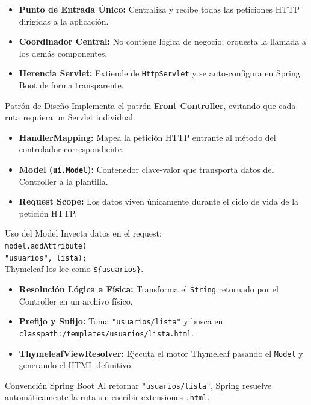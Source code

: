 \documentclass[aspectratio=169]{beamer}
\begin{document}
  {
    \begin{itemize}
      \item \textbf{Punto de Entrada \'Unico:} Centraliza y recibe todas las peticiones HTTP dirigidas a la aplicaci\'on.
      \item \textbf{Coordinador Central:} No contiene l\'ogica de negocio; orquesta la llamada a los dem\'as componentes.
      \item \textbf{Herencia Servlet:} Extiende de \texttt{HttpServlet} y se auto-configura en Spring Boot de forma transparente.
    \end{itemize}
  }
  {Patr\'on de Dise\~no}
  {Implementa el patr\'on \textbf{Front Controller}, evitando que cada ruta requiera un Servlet individual.}

  {
    \begin{itemize}
      \item \textbf{HandlerMapping:} Mapea la petici\'on HTTP entrante al m\'etodo del controlador correspondiente.
      \item \textbf{Model (\texttt{ui.Model}):} Contenedor clave-valor que transporta datos del Controller a la plantilla.
      \item \textbf{Request Scope:} Los datos viven \'unicamente durante el ciclo de vida de la petici\'on HTTP.
    \end{itemize}
  }
  {Uso del Model}
  {Inyecta datos en el request:\\
   \vspace{2pt}
   \texttt{model.addAttribute(}\\
   \texttt{\phantom{..}"usuarios", lista);}\\[4pt]
   Thymeleaf los lee como \texttt{\$\{usuarios\}}.}

  {
    \begin{itemize}
      \item \textbf{Resoluci\'on L\'ogica a F\'isica:} Transforma el \texttt{String} retornado por el Controller en un archivo f\'isico.
      \item \textbf{Prefijo y Sufijo:} Toma \texttt{"usuarios/lista"} y busca en \texttt{classpath:/templates/usuarios/lista.html}.
      \item \textbf{ThymeleafViewResolver:} Ejecuta el motor Thymeleaf pasando el \texttt{Model} y generando el HTML definitivo.
    \end{itemize}
  }
  {Convenci\'on Spring Boot}
  {Al retornar \texttt{"usuarios/lista"}, Spring resuelve autom\'aticamente la ruta sin escribir extensiones \texttt{.html}.}
\end{document}
